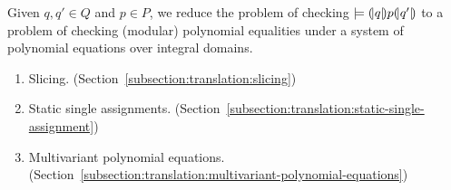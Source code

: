 
Given $q, q' \in Q$ and $p \in P$, we reduce the problem of checking
$\models {(\!|}{q}{|\!)} p {(\!|}{q'}{|\!)}$ to a problem of checking (modular)
polynomial equalities under a system of polynomial equations over
integral domains.

\begin{enumerate}
\item Slicing. (Section~\ref{subsection:translation:slicing})
\item Static single
  assignments. (Section~\ref{subsection:translation:static-single-assignment})
\item Multivariant polynomial
  equations. (Section~\ref{subsection:translation:multivariant-polynomial-equations})
\end{enumerate}

